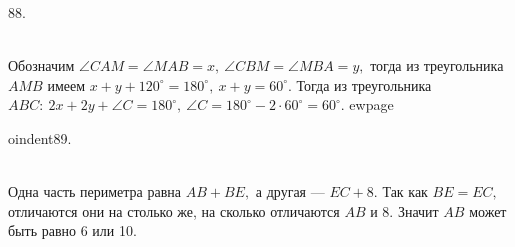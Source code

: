 88. \begin{figure}[ht!]
\end{figure}\\
Обозначим $\angle CAM=\angle MAB=x,\ \angle CBM=\angle MBA=y,$ тогда из треугольника $AMB$ имеем $x+y+120^\circ=180^\circ,\ x+y=60^\circ.$ Тогда из треугольника $ABC:\ 2x+2y+\angle C=180^\circ,\ \angle C=180^\circ-2\cdot60^\circ=60^\circ.$
ewpage

oindent89. \begin{figure}[ht!]
\end{figure}\\
Одна часть периметра равна $AB+BE,$ а другая --- $EC+8.$ Так как $BE=EC,$ отличаются они на столько же, на сколько отличаются $AB$ и 8. Значит $AB$ может быть равно 6 или 10.\\
